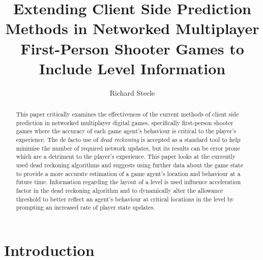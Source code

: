 \documentclass[journal]{IEEEtran}
\begin{document}
%
\title{Extending Client Side Prediction Methods in Networked Multiplayer First-Person Shooter Games to Include Level Information}
%
%
\author{Richard Steele}


\maketitle

\begin{abstract}
This paper critically examines the effectiveness of the current methods of client side prediction in networked multiplayer digital games, specifically first-person shooter games where the accuracy of each game agent's behaviour is critical to the player's experience. The de facto use of \textit{dead reckoning} is accepted as a standard tool to help minimise the number of required network updates, but its results can be error prone which are a detriment to the player's experience. This paper looks at the currently used dead reckoning algorithms and suggests using further data about the game state to provide a more accurate estimation of a game agent's location and behaviour at a future time. Information regarding the layout of a level is used influence acceleration factor in the dead reckoning algorithm and to dynamically alter the allowance threshold to better reflect an agent's behaviour at critical locations in the level by prompting an increased rate of player state updates.
\end{abstract}

\section{Introduction}
% 
% 
% 
\end{document}
